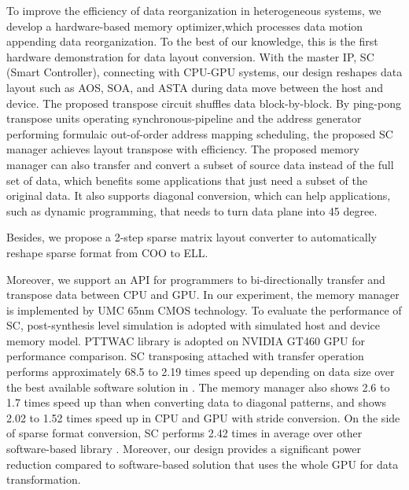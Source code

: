 \documentclass[10pt,journal,compsoc]{IEEEtran}
\begin{document}

To improve the efficiency of data reorganization in heterogeneous systems, we develop a hardware-based memory optimizer,which processes data motion appending data reorganization.
To the best of our knowledge, this is the first hardware demonstration
for data layout conversion.
With the master IP, SC (Smart Controller), connecting with CPU-GPU systems,
our design reshapes data layout such as AOS, SOA, and ASTA
during data move between the host and device.
The proposed transpose circuit shuffles data block-by-block. By ping-pong transpose units operating
synchronous-pipeline and the address generator performing
formulaic out-of-order address mapping scheduling, the proposed SC manager
achieves layout transpose with efficiency.
The proposed memory manager can also transfer and convert a subset of source data instead of the full set of data, which benefits some applications that just need a subset of the original data. It also supports diagonal conversion, which can help applications, such as dynamic programming, that needs to turn data plane into 45 degree.

Besides, we propose a 2-step sparse matrix layout converter to automatically reshape sparse format from COO to ELL.


Moreover, we support an API for programmers to bi-directionally
transfer and transpose data between CPU and GPU.
In our experiment, the memory manager is implemented
by UMC 65nm CMOS technology. To evaluate the performance of SC,
post-synthesis level simulation is adopted with simulated host
and device memory model. PTTWAC library \cite{ASTA} is adopted
on NVIDIA GT460 GPU for performance comparison.
SC transposing attached with transfer operation performs approximately
68.5 to 2.19 times speed up depending on data size
over the best available software solution in \cite{ASTA}.
The memory manager also shows 2.6 to 1.7 times speed up than \cite{Dymaxion} when converting data to diagonal patterns, and shows 2.02 to 1.52 times speed up in CPU and GPU with stride conversion.
On the side of sparse format conversion, SC performs
2.42 times in average over other software-based library \cite{Cusp}.
Moreover, our design
provides a significant power reduction compared to software-based
solution that uses the whole GPU for data transformation.


\end{document}
